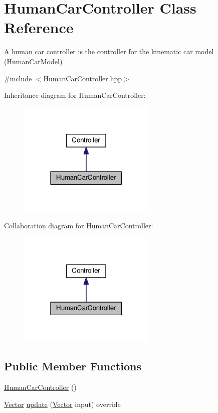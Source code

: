 \hypertarget{classHumanCarController}{}\section{Human\+Car\+Controller Class Reference}
\label{classHumanCarController}


A human car controller is the controller for the kinematic car model (\hyperlink{classHumanCarModel}{Human\+Car\+Model})  




{\ttfamily \#include $<$Human\+Car\+Controller.\+hpp$>$}



Inheritance diagram for Human\+Car\+Controller\+:\nopagebreak
\begin{figure}[H]
\begin{center}
\leavevmode
\includegraphics[width=186pt]{classHumanCarController__inherit__graph}
\end{center}
\end{figure}


Collaboration diagram for Human\+Car\+Controller\+:\nopagebreak
\begin{figure}[H]
\begin{center}
\leavevmode
\includegraphics[width=186pt]{classHumanCarController__coll__graph}
\end{center}
\end{figure}
\subsection*{Public Member Functions}
\begin{DoxyCompactItemize}
\item 
\hyperlink{classHumanCarController_a34efd6c56d364c6a55056ee37136da4b}{Human\+Car\+Controller} ()
\item 
\hyperlink{Agent_8hpp_a5dd127bb3cb18b011cf5fd80a906e830}{Vector} \hyperlink{classHumanCarController_aa20daebb65f2e2111f5d7af09b81d886}{update} (\hyperlink{Agent_8hpp_a5dd127bb3cb18b011cf5fd80a906e830}{Vector} input) override
\end{DoxyCompactItemize}
